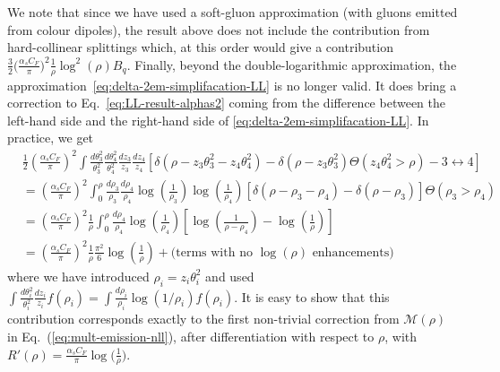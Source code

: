 We note that since we have used a soft-gluon approximation (with
gluons emitted from colour dipoles), the result above does not
include the contribution from hard-collinear splittings which, at this
order would give a contribution
$\frac{3}{2}\big(\frac{\alpha_sC_F}{\pi}\big)^2\frac{1}{\rho}\log^2(\rho)B_q$.
%
Finally, beyond the double-logarithmic approximation, the
approximation~\eqref{eq:delta-2em-simplifacation-LL} is no longer
valid. It does bring a correction to Eq.~\eqref{eq:LL-result-alphas2}
coming from the difference between the left-hand side and the right-hand side of
\eqref{eq:delta-2em-simplifacation-LL}.
%
In practice, we get
%
\begin{align}
& \frac{1}{2} \left ( \frac{\alpha_sC_F}{\pi} \right)^2 
\int \frac{d\theta_3^2}{\theta_3^2}\frac{d\theta_4^2}{\theta_4^2} 
  \frac{dz_3}{z_3} \frac{dz_4}{z_4} \left[
 \delta\left(\rho-z_3 \theta_3^2-z_4 \theta_4^2\right)
 -\delta\left(\rho-z_3 \theta_3^2\right)\Theta\left(z_4 \theta_4^2 >\rho \right)
 -3 \leftrightarrow 4 \right]\nonumber\\
  &= \left ( \frac{\alpha_sC_F}{\pi} \right)^2 
\int_0^\rho \frac{d\rho_3}{\rho_3}\frac{d\rho_4}{\rho_4} 
  \log\left(\frac{1}{\rho_3}\right)\log\left(\frac{1}{\rho_4}\right) \left[
 \delta\left(\rho-\rho_3-\rho_4\right) -\delta\left(\rho-\rho_3\right)\right]
    \Theta(\rho_3>\rho_4)\nonumber\\
  &= \left ( \frac{\alpha_sC_F}{\pi} \right)^2 \frac{1}{\rho}
\int_0^\rho \frac{d\rho_4}{\rho_4} 
  \log\left(\frac{1}{\rho_4}\right)
    \left[\log\left(\frac{1}{\rho-\rho_4}\right)-\log\left(\frac{1}{\rho}\right)\right]\nonumber\\
  &= \left ( \frac{\alpha_sC_F}{\pi} \right)^2 \frac{1}{\rho}
\frac{\pi^2}{6}  \log\left(\frac{1}{\rho}\right) + \text{(terms with no
    $\log(\rho)$ enhancements)}
\end{align}
%
where we have introduced $\rho_i=z_i\theta_i^2$ and used
$\int\frac{d\theta_i^2}{\theta_i^2}\frac{dz_i}{z_i}f(\rho_i) = \int\frac{d\rho_i}{\rho_i}\log(1/\rho_i)f(\rho_i)$.
% 
It is easy to show that this contribution corresponds exactly to the
first non-trivial correction from $\mathcal{M}(\rho)$ in
Eq.~(\ref{eq:mult-emission-nll}), after differentiation with respect to $\rho$,
with $R'(\rho)=\frac{\alpha_sC_F}{\pi}\log\big(\tfrac{1}{\rho}\big)$.

